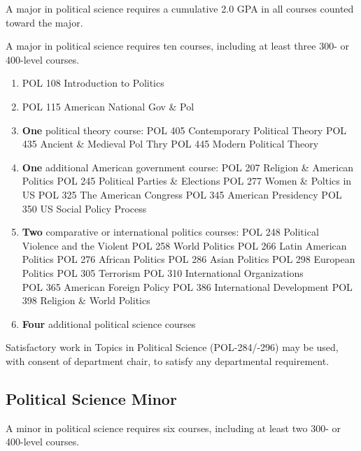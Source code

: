 \documentclass[
  letterpaper,
]{scrbook}
\begin{document}
A major in political science requires a cumulative 2.0 GPA in all
courses counted toward the major.

A major in political science requires ten courses, including at least
three 300- or 400-level courses.

\begin{enumerate}
\def\labelenumi{\arabic{enumi}.}
\item
  POL 108 Introduction to Politics
\item
  POL 115 American National Gov \& Pol
\item
  \textbf{One} political theory course: POL 405 Contemporary Political
  Theory POL 435 Ancient \& Medieval Pol Thry POL 445 Modern Political
  Theory
\item
  \textbf{One} additional American government course: POL 207 Religion
  \& American Politics POL 245 Political Parties \& Elections POL 277
  Women \& Poltics in US POL 325 The American Congress POL 345 American
  Presidency POL 350 US Social Policy Process
\item
  \textbf{Two} comparative or international politics courses: POL 248
  Political Violence and the Violent POL 258 World Politics POL 266
  Latin American Politics POL 276 African Politics POL 286 Asian
  Politics POL 298 European Politics POL 305 Terrorism POL 310
  International Organizations\\
  POL 365 American Foreign Policy POL 386 International Development POL
  398 Religion \& World Politics
\item
  \textbf{Four} additional political science courses
\end{enumerate}

Satisfactory work in Topics in Political Science (POL-284/-296) may be
used, with consent of department chair, to satisfy any departmental
requirement.

\hypertarget{political-science-minor}{%
\subsection{Political Science Minor}\label{political-science-minor}}

A minor in political science requires six courses, including at least
two 300- or 400-level courses.
\end{document}
